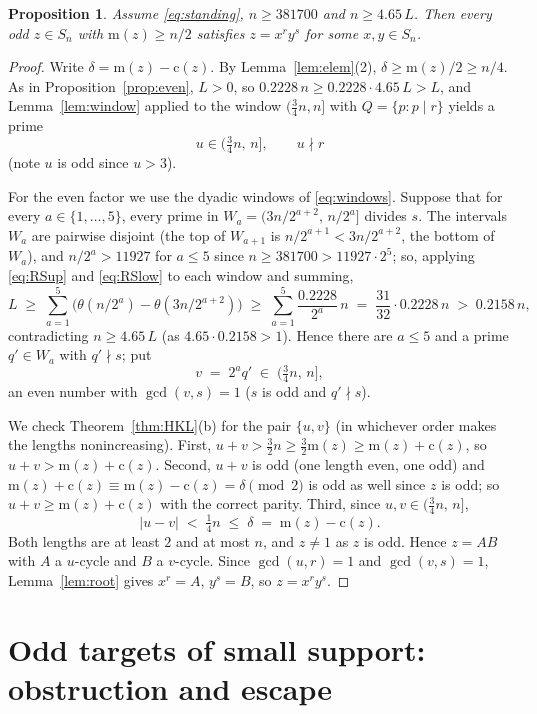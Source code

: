 \documentclass[11pt]{amsart}
\numberwithin{equation}{section}
\newtheorem{proposition}[theorem]{Proposition}
\theoremstyle{remark}
\newcommand{\md}{\mathrm{m}}   %
\newcommand{\cy}{\mathrm{c}}   %
\begin{document}
\begin{proposition}\label{prop:dense}
Assume \eqref{eq:standing}, $n\ge 381700$ and $n\ge4.65\,L$. Then every odd
$z\in S_n$ with $\md(z)\ge n/2$ satisfies $z=x^ry^s$ for some $x,y\in S_n$.
\end{proposition}

\begin{proof}
Write $\delta=\md(z)-\cy(z)$. By Lemma~\ref{lem:elem}(2),
$\delta\ge \md(z)/2\ge n/4$. As in Proposition~\ref{prop:even}, $L>0$, so
$0.2228\,n\ge0.2228\cdot4.65\,L>L$, and Lemma~\ref{lem:window} applied to the
window $(\tfrac34n,n]$ with $Q=\{p:p\mid r\}$ yields a prime
\[
u\in(\tfrac34n,\,n],\qquad u\nmid r
\]
(note $u$ is odd since $u>3$).

For the even factor we use the dyadic windows of \eqref{eq:windows}. Suppose
that for every $a\in\{1,\dots,5\}$, every prime in
$W_a=(3n/2^{a+2},\,n/2^a]$ divides $s$. The intervals $W_a$ are pairwise
disjoint (the top of $W_{a+1}$ is $n/2^{a+1}<3n/2^{a+2}$, the bottom of $W_a$),
and $n/2^a>11927$ for $a\le5$ since $n\ge381700>11927\cdot2^5$; so, applying
\eqref{eq:RSup} and \eqref{eq:RSlow} to each window and summing,
\[
L\;\ge\;\sum_{a=1}^{5}\bigl(\theta(n/2^a)-\theta(3n/2^{a+2})\bigr)
\;\ge\;\sum_{a=1}^{5}\frac{0.2228}{2^a}\,n\;=\;\frac{31}{32}\cdot0.2228\,n
\;>\;0.2158\,n ,
\]
contradicting $n\ge4.65\,L$ (as $4.65\cdot0.2158>1$). Hence there are $a\le5$
and a prime $q'\in W_a$ with $q'\nmid s$; put
\[
v\;=\;2^aq'\;\in\;(\tfrac34n,\,n] ,
\]
an even number with $\gcd(v,s)=1$ ($s$ is odd and $q'\nmid s$).

We check Theorem~\ref{thm:HKL}(b) for the pair $\{u,v\}$ (in whichever order makes
the lengths nonincreasing). First,
$u+v>\tfrac32n\ge\tfrac32\md(z)\ge\md(z)+\cy(z)$, so
$u+v>\md(z)+\cy(z)$. Second, $u+v$ is odd (one length even, one odd) and
$\md(z)+\cy(z)\equiv \md(z)-\cy(z)=\delta \pmod 2$ is
odd as well since $z$ is odd; so
$u+v\ge \md(z)+\cy(z)$ with the correct parity. Third, since
$u,v\in(\tfrac34n,\,n]$,
\[
|u-v|\;<\;\tfrac14 n\;\le\;\delta\;=\;\md(z)-\cy(z) .
\]
Both lengths are at least $2$ and at most $n$, and $z\neq1$ as $z$ is odd. Hence
$z=AB$ with $A$ a $u$-cycle and $B$ a $v$-cycle. Since $\gcd(u,r)=1$ and
$\gcd(v,s)=1$, Lemma~\ref{lem:root} gives
$x^r=A$, $y^s=B$, so $z=x^ry^s$.
\end{proof}

\section{Odd targets of small support: obstruction and escape}\label{sec:sparse}
\end{document}
